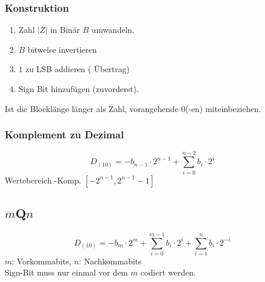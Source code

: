 \subsubsection{Konstruktion}
\begin{enumerate}
    \item Zahl $|Z|$ in Binär $B$ umwandeln.
    \item $B$ bitweise invertieren
    \item $1$ zu LSB addieren (\cemph{!} Übertrag)
    \item Sign Bit hinzufügen (zuvorderst).
\end{enumerate}
Ist die Blocklänge länger als Zahl, vorangehende $0$(-en) miteinbeziehen.
\subsubsection{\twocom Komplement zu Dezimal}
\begin{equation*}
    \displaystyle
    D_{(10)} = - b_{n-1} \cdot 2^{n-1} + \sum_{i = 0}^{n-2} b_i \cdot 2^i
\end{equation*}
Wertebereich \twocom-Komp. $\left[-2^{n-1}, 2^{n-1} -1\right]$
\subsection{$m$Q$n$}
\begin{equation*}
    D_{(10)} = -b_m \cdot 2^m + \sum_{i = 0}^{m - 1} b_i \cdot 2^i + \sum_{i = 1}^{n} b_i \cdot 2^{-i}
\end{equation*}
$m$: Vorkommabits, $n$: Nachkommabits\\
Sign-Bit muss nur einmal vor dem $m$ codiert werden.

